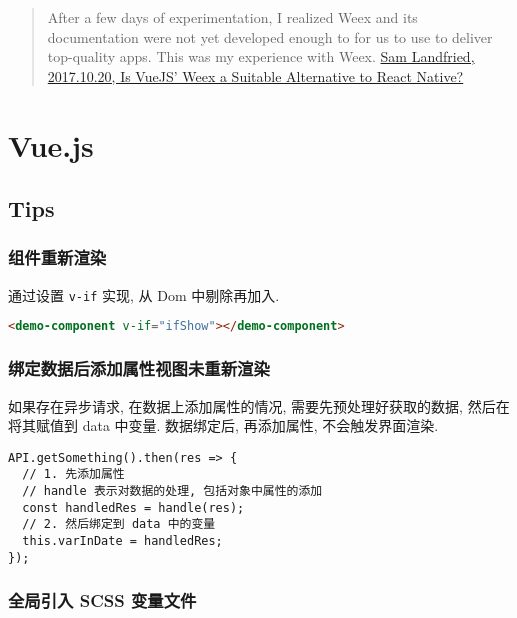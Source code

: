 \begin{quote}
After a few days of experimentation, I realized Weex and its
documentation were not yet developed enough to for us to use to deliver
top-quality apps. This was my experience with Weex.
\href{https://www.bignerdranch.com/blog/is-vuejs-weex-a-suitable-alternative-to-react-native/}{Sam
Landfried, 2017.10.20, Is VueJS' Weex a Suitable Alternative to React
Native?}
\end{quote}

\section{Vue.js}\label{vue.js}

\subsection{Tips}\label{tips-1}

\subsubsection{组件重新渲染}\label{ux7ec4ux4ef6ux91cdux65b0ux6e32ux67d3}

通过设置 \lstinline!v-if! 实现, 从 Dom 中剔除再加入.

\begin{lstlisting}[language=HTML]
<demo-component v-if="ifShow"></demo-component>
\end{lstlisting}

\subsubsection{绑定数据后添加属性视图未重新渲染}\label{ux7ed1ux5b9aux6570ux636eux540eux6dfbux52a0ux5c5eux6027ux89c6ux56feux672aux91cdux65b0ux6e32ux67d3}

如果存在异步请求, 在数据上添加属性的情况, 需要先预处理好获取的数据,
然后在将其赋值到 data 中变量. 数据绑定后, 再添加属性, 不会触发界面渲染.

\begin{lstlisting}
API.getSomething().then(res => {
  // 1. 先添加属性
  // handle 表示对数据的处理, 包括对象中属性的添加
  const handledRes = handle(res);
  // 2. 然后绑定到 data 中的变量
  this.varInDate = handledRes;
});
\end{lstlisting}

\subsubsection{全局引入 SCSS
变量文件}\label{ux5168ux5c40ux5f15ux5165-scss-ux53d8ux91cfux6587ux4ef6}

